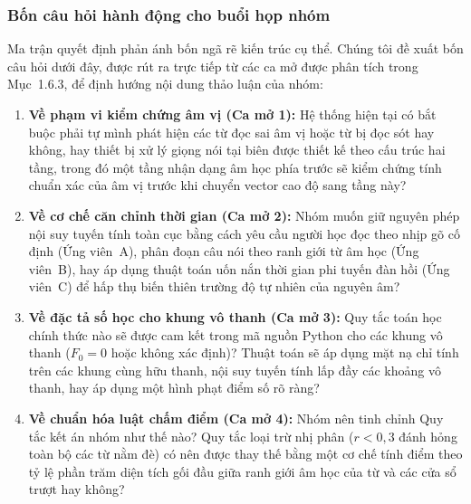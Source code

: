 \documentclass[11pt,a4paper]{article}
\begin{document}
\subsubsection*{Bốn câu hỏi hành động cho buổi họp nhóm}

Ma trận quyết định phản ánh bốn ngã rẽ kiến trúc cụ thể. Chúng tôi đề xuất bốn câu hỏi dưới đây, được rút ra trực tiếp từ các ca mở được phân tích trong Mục~1.6.3, để định hướng nội dung thảo luận của nhóm:

\begin{enumerate}
    \item \textbf{Về phạm vi kiểm chứng âm vị (Ca mở 1):} Hệ thống hiện tại có bắt buộc phải tự mình phát hiện các từ đọc sai âm vị hoặc từ bị đọc sót hay không, hay thiết bị xử lý giọng nói tại biên được thiết kế theo cấu trúc hai tầng, trong đó một tầng nhận dạng âm học phía trước sẽ kiểm chứng tính chuẩn xác của âm vị trước khi chuyển vector cao độ sang tầng này?
    \item \textbf{Về cơ chế căn chỉnh thời gian (Ca mở 2):} Nhóm muốn giữ nguyên phép nội suy tuyến tính toàn cục bằng cách yêu cầu người học đọc theo nhịp gõ cố định (Ứng viên~A), phân đoạn câu nói theo ranh giới từ âm học (Ứng viên~B), hay áp dụng thuật toán uốn nắn thời gian phi tuyến đàn hồi (Ứng viên~C) để hấp thụ biến thiên trường độ tự nhiên của nguyên âm?
    \item \textbf{Về đặc tả số học cho khung vô thanh (Ca mở 3):} Quy tắc toán học chính thức nào sẽ được cam kết trong mã nguồn Python cho các khung vô thanh ($F_0 = 0$ hoặc không xác định)? Thuật toán sẽ áp dụng mặt nạ chỉ tính trên các khung cùng hữu thanh, nội suy tuyến tính lấp đầy các khoảng vô thanh, hay áp dụng một hình phạt điểm số rõ ràng?
    \item \textbf{Về chuẩn hóa luật chấm điểm (Ca mở 4):} Nhóm nên tinh chỉnh Quy tắc kết án nhóm như thế nào? Quy tắc loại trừ nhị phân ($r < 0{,}3$ đánh hỏng toàn bộ các từ nằm đè) có nên được thay thế bằng một cơ chế tính điểm theo tỷ lệ phần trăm diện tích gối đầu giữa ranh giới âm học của từ và các cửa sổ trượt hay không?
\end{enumerate}
\end{document}
